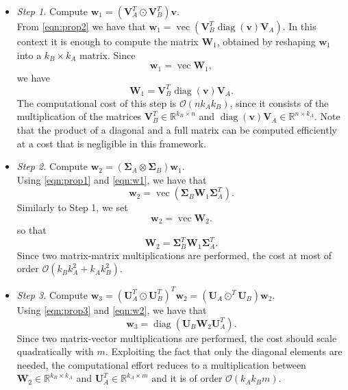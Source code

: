 \documentclass[10pt,titlepage]{article}
\numberwithin{equation}{section}
\numberwithin{figure}{section}
\DeclareMathOperator{\myvec}{vec}
\DeclareMathOperator{\diag}{diag}
\begin{document}
\begin{itemize}
	\item \textit{Step 1.} Compute $\mathbf{w}_1=\left( \mathbf{V}_A^T \odot \mathbf{V}_B^T \right) \mathbf{v}$. \\
	From \eqref{eqn:prop2} we have that
	$\mathbf{w}_1=\myvec (\mathbf{V}_B^T \diag(\mathbf{v}) \mathbf{V}_A) $. In this context it is enough to compute the matrix $\mathbf{W}_1$, obtained by reshaping $\mathbf{w}_1$ into a $k_B \times k_A$ matrix. Since
	\begin{equation}
		\mathbf{w}_1=\myvec\mathbf{W}_1,
		\label{eqn:w1}
	\end{equation}
	we have
	\begin{equation}
		\mathbf{W}_1=\mathbf{V}_B^T \diag(\mathbf{v}) \mathbf{V}_A.
	\end{equation}
	The computational cost of this step is $\mathcal{O}(n k_A k_B)$, since it consists of the multiplication of the matrices $\mathbf{V}_B^T \in \mathbb{R}^{k_B \times n}$ and $\diag(\mathbf{v}) \mathbf{V}_A \in \mathbb{R}^{n \times k_A}$. Note that the product of a diagonal and a full matrix can be computed efficiently at a cost that is negligible in this framework.
	
	\item \textit{Step 2.} Compute $\mathbf{w}_2=\left( \mathbf{\Sigma}_A \otimes \mathbf{\Sigma}_B \right) \mathbf{w}_1$. \\
	Using \eqref{eqn:prop1} and \eqref{eqn:w1}, we have that
	\begin{equation}
		\mathbf{w}_2=\myvec( \mathbf{\Sigma}_B \mathbf{W}_1 \mathbf{\Sigma}_A^T ).
	\end{equation}
	Similarly to Step 1, we set
	\begin{equation}
	\mathbf{w}_2=\myvec\mathbf{W}_2.
	\label{eqn:w2}
	\end{equation}
	so that
	\begin{equation}
	\mathbf{W}_2=\mathbf{\Sigma}_B^T \mathbf{W}_1 \mathbf{\Sigma}_A^T.
	\end{equation}
	Since two matrix-matrix multiplications are performed, the cost at most of order $\mathcal{O}(k_Bk_A^2+k_Ak_B^2)$.
	
	\item \textit{Step 3.} Compute $\mathbf{w}_3=\left( \mathbf{U}_A^T \odot \mathbf{U}_B^T \right)^T \mathbf{w}_2=\left( \mathbf{U}_A \odot^T \mathbf{U}_B \right) \mathbf{w}_2$. \\
	Using \eqref{eqn:prop3} and \eqref{eqn:w2}, we have that
	\begin{equation}
	\mathbf{w}_3=\diag( \mathbf{U}_B \mathbf{W}_2 \mathbf{U}_A^T ).
	\end{equation}
	Since two matrix-vector multiplications are performed, the cost should scale quadratically with $m$. Exploiting the fact that only the diagonal elements are needed, the computational effort reduces to a multiplication between $\mathbf{W}_2 \in \mathbb{R}^{k_B \times k_A}$ and $\mathbf{U}_A^T \in \mathbb{R}^{k_A \times m}$ and it is of order $\mathcal{O}(k_A k_B m)$.
\end{itemize}
\end{document}
